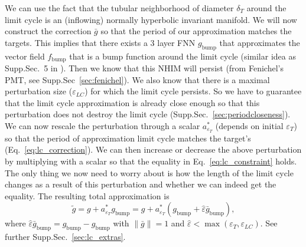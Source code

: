 \documentclass{article}
\newcounter{ct}
\begin{document}
We can use the fact that the tubular neighborhood of diameter $\delta_T$ around the limit cycle is an (inflowing) normally hyperbolic invariant manifold.
We will now construct the correction $\bar{g}$ so that the period of our approximation matches the targets.
This implies that there exists a 3 layer FNN $g_{\operatorname{bump}}$ that approximates the vector field $f_{\operatorname{bump}}$ that is a bump function around the limit cycle (similar idea as Supp.Sec.~5 in  \citep{Sagodi2024a}). %
Then we know that this NHIM will persist (from Fenichel's PMT, see Supp.Sec~\ref{sec:fenichel}).
We also know that there is a maximal perturbation size ($\varepsilon_{LC}$) for which the limit cycle persists.
So we have to guarantee that the limit cycle approximation is already close enough so that this perturbation does not destroy the limit cycle (Supp.Sec.~\ref{sec:periodcloseness}). %
We can now rescale the perturbation through a scalar $a_{\varepsilon_T}^*$ (depends on initial $\varepsilon_T$) so that the period of approximation limit cycle matches the target's (Eq.~\ref{eq:lc_correction}). 
We can then increase or decrease the above perturbation by multiplying with a scalar so that the equality in Eq.~\ref{eq:lc_constraint} holds.
The only thing we now need to worry about is how the length of the limit cycle changes as a result of this perturbation and whether we can indeed get the equality.
%
The resulting total approximation is %
\begin{equation}\label{eq:lc_correction}
\tilde{g}= g+a_{\varepsilon_T}^*g_{\operatorname{bump}} = 
g + a_{\varepsilon_T}^*(g_{\operatorname{bump}}+ \hat{\varepsilon}\bar{g}_{\operatorname{bump}}),
 \end{equation}
where $\hat{\varepsilon}\bar{g}_{\operatorname{bump}} = g_{\operatorname{bump}} - g_{\operatorname{bump}}$ with $\|\bar g\|=1$ and $\hat \varepsilon <\max(\varepsilon_T,\varepsilon_{LC})$. %
%
See further Supp.Sec.~\ref{sec:lc_extras}.
\end{document}
